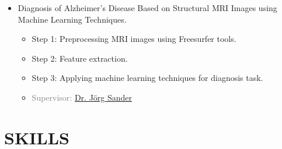 \documentclass[11pt,a4paper,sans]{moderncv} %
\begin{document}
\begin{itemize}
\begin{itemize}
    		\item Diagnosis of Alzheimer's Disease Based on Structural MRI Images using Machine Learning Techniques.
    		\begin{itemize}
    
    			\item Step 1: Preprocessing MRI images using Freesurfer tools.
    			\item Step 2: Feature extraction.
    			\item Step 3: Applying machine learning techniques for diagnosis task.
    			\item \textcolor{gray}{Supervisor: \href{http://webdocs.cs.ualberta.ca/~joerg/}{Dr. Jörg Sander}}
    			
    		\end{itemize}
		\end{itemize}
	\end{itemize}
	

	\section{SKILLS}
	
\end{document}

